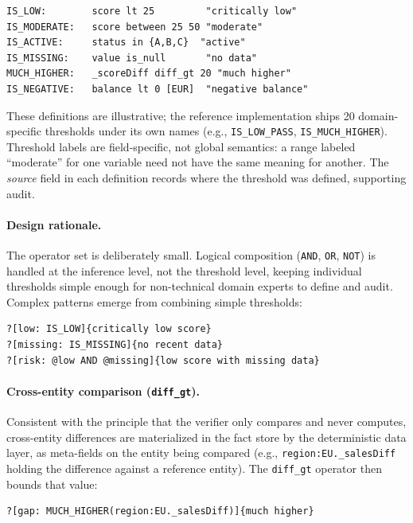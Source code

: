 \documentclass[11pt,a4paper]{article}
\begin{document}
\begin{lstlisting}
IS_LOW:        score lt 25         "critically low"
IS_MODERATE:   score between 25 50 "moderate"
IS_ACTIVE:     status in {A,B,C}  "active"
IS_MISSING:    value is_null       "no data"
MUCH_HIGHER:   _scoreDiff diff_gt 20 "much higher"
IS_NEGATIVE:   balance lt 0 [EUR]  "negative balance"
\end{lstlisting}

\noindent These definitions are illustrative; the reference implementation ships 20 domain-specific thresholds under its own names (e.g., \texttt{IS\_LOW\_PASS}, \texttt{IS\_MUCH\_HIGHER}). Threshold labels are field-specific, not global semantics: a range labeled ``moderate'' for one variable need not have the same meaning for another. The \textit{source} field in each definition records where the threshold was defined, supporting audit.

\paragraph{Design rationale.} The operator set is deliberately small. Logical composition (\texttt{AND}, \texttt{OR}, \texttt{NOT}) is handled at the inference level, not the threshold level, keeping individual thresholds simple enough for non-technical domain experts to define and audit. Complex patterns emerge from combining simple thresholds:

\begin{lstlisting}
?[low: IS_LOW]{critically low score}
?[missing: IS_MISSING]{no recent data}
?[risk: @low AND @missing]{low score with missing data}
\end{lstlisting}

\paragraph{Cross-entity comparison (\texttt{diff\_gt}).} Consistent with the principle that the verifier only compares and never computes, cross-entity differences are materialized in the fact store by the deterministic data layer, as meta-fields on the entity being compared (e.g., \texttt{region:EU.\_salesDiff} holding the difference against a reference entity). The \texttt{diff\_gt} operator then bounds that value:

\begin{lstlisting}
?[gap: MUCH_HIGHER(region:EU._salesDiff)]{much higher}
\end{lstlisting}
\end{document}
